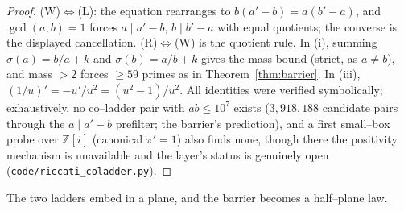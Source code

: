 \documentclass[11pt]{article}
\theoremstyle{definition}
\begin{document}
\begin{proof}
\textup{(W)}$\Leftrightarrow$\textup{(L)}: the equation rearranges to $b(a'-b)=a(b'-a)$, and
$\gcd(a,b)=1$ forces $a\mid a'-b$, $b\mid b'-a$ with equal quotients; the converse is the displayed
cancellation. \textup{(R)}$\Leftrightarrow$\textup{(W)} is the quotient rule. In (i), summing
$\sigma(a)=b/a+k$ and $\sigma(b)=a/b+k$ gives the mass bound (strict, as $a\neq b$), and mass
$>2$ forces $\ge59$ primes as in Theorem~\ref{thm:barrier}. In (iii),
$(1/u)'=-u'/u^2=(u^2-1)/u^2$. All identities were verified symbolically; exhaustively, no
co--ladder pair with $ab\le10^7$ exists ($3{,}918{,}188$ candidate pairs through the $a\mid a'-b$
prefilter; the barrier's prediction), and a first small--box probe over $\mathbb{Z}[i]$
(canonical $\pi'=1$) also finds none, though there the positivity mechanism is unavailable and the
layer's status is genuinely open (\texttt{code/riccati\_coladder.py}).
\end{proof}

The two ladders embed in a plane, and the barrier becomes a half--plane law.
\end{document}
